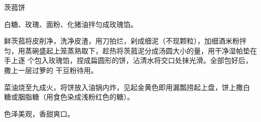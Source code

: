 %
%
%
%
%
%
%
\begin{recipe}{茨菰饼}

\ingredients


\preparation

\step 白糖、玫瑰、面粉、化猪油拌匀成玫瑰馅。

\step 鲜茨菰将皮削净，洗净皮渣，用刀拍烂，剁成细泥（不现颗粒），加细酒米粉拌
匀，用蒸碗盛起上笼蒸熟取下，趁热将茨菰泥分成汤圆大小的量，用干净湿帕垫在手上逐
个包入玫瑰馅，捏成扁圆形的饼，沾清水将交口处抹光滑。全部包好后，撒上一层过箩的
干豆粉待用。

\step 菜油烧至九成火，将饼放入油锅内炸，见起金黄色即用漏瓢捞起上盘，饼上撒白
糖或胭脂糖（用食色染成浅粉红色的糖）。

\features

色泽美观，香甜爽口。

\end{recipe}

